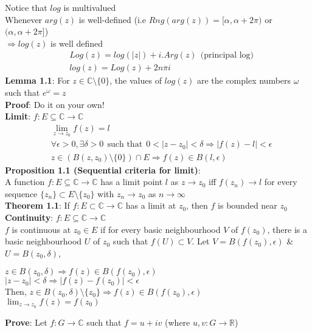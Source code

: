 \documentclass{article}
\begin{document}
\begin{flushleft}
Notice that $log$ is multivalued\\
\clearpage
Whenever $arg(z)$ is well-defined (i.e $Rng(arg(z))=[\alpha,\alpha+2\pi)$ or $(\alpha,\alpha+2\pi]$)\\$\Rightarrow log(z)$ is well defined
\begin{align}
&Log(z)=log(|z|)+i.Arg(z) \:\:\text{(principal log)} \nonumber\\
&log(z)=Log(z)+2n\pi i \nonumber
\end{align}
\textbf{Lemma 1.1}: For $z\in \mathds{C}\setminus \{0\}$, the values of $log(z)$ are the complex numbers $\omega$ such that $e^{\omega}=z$\\
\textbf{Proof}: Do it on your own!\\
\vspace{3mm}
\textbf{Limit}: $f: E\subseteq \mathds{C} \rightarrow \mathds{C}$
\begin{align}
&\lim_{z \to z_0} f(z)=l \nonumber\\
&\forall \epsilon>0,\exists \delta>0 \:\:\text{such that}\:\: 0<|z-z_0|<\delta \Rightarrow |f(z)-l|<\epsilon\nonumber\\
&z \in (B(z,z_0)\setminus\{0\})\cap E \Rightarrow f(z)\in B(l,\epsilon) \nonumber
\end{align}
\textbf{Proposition 1.1 (Sequential criteria for limit)}: \\ A function $f:E\subseteq  \mathds{C}\rightarrow \mathds{C}$ has a limit point $l$ as $z\rightarrow z_0$ iff $f(z_n)\rightarrow l$ for every sequence $\{z_n\}\subset E\setminus \{z_0\}$ with $z_n\rightarrow z_0$ as $n\rightarrow \infty$\\
\vspace{2mm}
\textbf{Theorem 1.1}: If $f:E\subset \mathds{C} \rightarrow \mathds{C}$ has a limit at $z_0$, then $f$ is bounded near $z_0$\\
\vspace{2mm}
\textbf{Continuity}: $f:E\subseteq \mathds{C}\rightarrow \mathds{C}$\\
$f$ is continuous at $z_0\in E$ if for every basic neighbourhood $V$ of $f(z_0)$, there is a basic neighbourhood $U$ of $z_0$ such that $f(U)\subset V$. Let $V=B(f(z_0),\epsilon)$ \& $U=B(z_0,\delta)$,
\begin{center}
$z\in B(z_0,\delta)\Rightarrow f(z)\in B(f(z_0),\epsilon)$\\
$|z-z_0|<\delta \Rightarrow |f(z)-f(z_0)|<\epsilon$\\
Then, $z\in B(z_0,\delta)\setminus \{z_0\} \Rightarrow f(z)\in B(f(z_0),\epsilon)$\\
$\lim_{z \to z_0} f(z)=f(z_0)$
\end{center}
\textbf{Prove}: Let $f:G\rightarrow \mathds{C}$ such that $f=u+ iv$ (where $u,v:G\rightarrow \mathds{R}$)


\end{flushleft}
\end{document}
